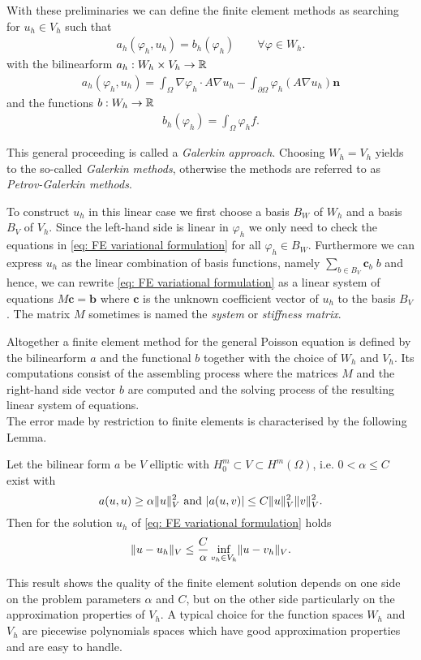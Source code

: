 With these preliminaries we can define the finite element methods as searching for $u_h \in V_h$ such that 
\begin{align}
a_h(\varphi_h,u_h) = b_h(\varphi_h) \qquad \forall \varphi \in W_h. \label{eq: FE variational formulation}
\end{align}
with the bilinearform  $a_h:W_h \times V_h \rightarrow \mathbb{R}$
\begin{align*}
a_h(\varphi_h,u_h)  = \int_\Omega \nabla \varphi_h  \cdot A\nabla u_h -\int_{\partial \Omega} \varphi_h (A\nabla u_h) \mathbf{n}
\end{align*}
and the functions $b:W_h \rightarrow \mathbb{R}$
\begin{align*}
b_h(\varphi_h) = \int_\Omega \varphi_h f.
\end{align*}

This general proceeding is called a \emph{Galerkin approach}. Choosing $W_h = V_h$ yields to the so-called \emph{Galerkin methods}, otherwise the methods are referred to as \emph{Petrov-Galerkin methods}.

To construct $u_h$ in this linear case we first choose a basis $B_W$ of $W_h$ and a basis $B_V$ of $V_h$.
Since the left-hand side is linear in $\varphi_h$ we only need to check the equations in \eqref{eq: FE variational formulation} for all $\varphi_h \in B_W$. 
Furthermore we can express $u_h$ as the linear combination of basis functions, namely $\sum_{b \in B_V} \mathbf{c}_b \; b$ and hence, we can rewrite \eqref{eq: FE variational formulation} as a linear system of equations $M \mathbf{c} = \mathbf{b}$ where  $\mathbf{c}$ is the unknown coefficient vector of $u_h$ to the basis $B_V$.  The matrix $M$ sometimes is named the \emph{system} or \emph{stiffness matrix}.

Altogether a finite element method for the general Poisson equation is defined by the bilinearform $a$ and the functional $b$ together with the choice of $W_h$ and $V_h$. Its computations consist of the assembling process where the matrices $M$ and the right-hand side vector $b$ are computed and the solving process of the resulting linear system of equations.\\
The error made by restriction to finite elements is characterised by the following Lemma.
\begin{lemma}
	Let the bilinear form $a$ be $V$ elliptic with $H_0^m \subset V \subset H^m(\Omega) $, i.e. $0 < \alpha \leq C$ exist with
	\[
		a(u,u) \geq \alpha  \lVert u \rVert ^2_V \text{ and } |a(u,v)| \leq C \lVert u \rVert ^2_V \lVert v \rVert ^2_V.
	\]
	Then for the solution $u_h$ of \eqref{eq: FE variational formulation}  holds
	\begin{align}
		\lVert u - u_h \rVert_V \leq \frac C \alpha \inf\limits_{v_h \in V_h} \lVert u-v_h \rVert_V.
	\end{align}
\end{lemma}
This result shows the quality of the finite element solution depends on one side on the problem parameters $\alpha$ and $C$, but on the other side particularly on the approximation properties of $V_h$. A typical choice for the function spaces $W_h$ and $V_h$ are piecewise polynomials spaces which have good approximation properties and are easy to handle.

